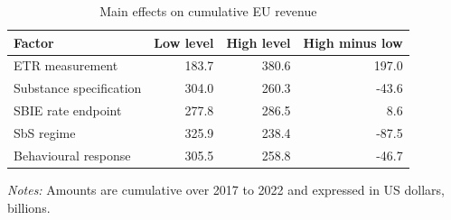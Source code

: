 \begin{table}[H]
\centering
\small
\caption[Main effects on cumulative EU revenue]{Main effects on cumulative EU revenue}
\label{tab:stage4_6_main_effects}
\begin{tabular}{@{}lrrr@{}}
\toprule
Factor & Low level & High level & High minus low \\
\midrule
ETR measurement & 183.7 & 380.6 & 197.0 \\
Substance specification & 304.0 & 260.3 & -43.6 \\
SBIE rate endpoint & 277.8 & 286.5 &   8.6 \\
SbS regime & 325.9 & 238.4 & -87.5 \\
Behavioural response & 305.5 & 258.8 & -46.7 \\
\bottomrule
\end{tabular}

\vspace{0.5em}
\begin{minipage}{0.96\textwidth}
\footnotesize\raggedright \textit{Notes:} Amounts are cumulative over 2017 to 2022 and expressed in US dollars, billions.
\end{minipage}
\end{table}
